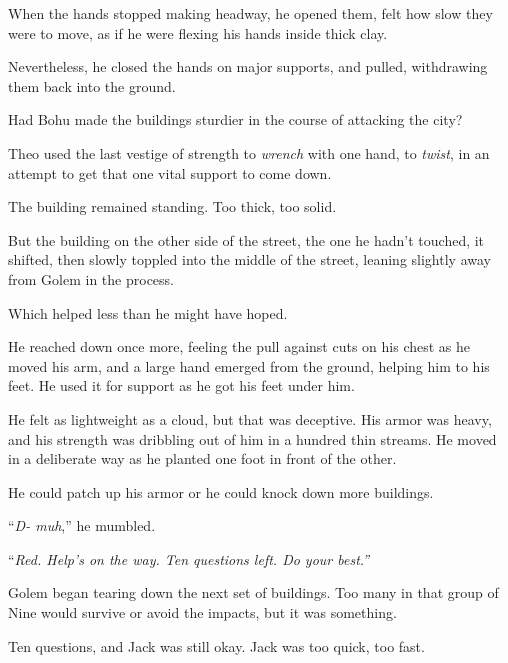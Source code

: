 When the hands stopped making headway, he opened them, felt how slow they were to move, as if he were flexing his hands inside thick clay.



Nevertheless, he closed the hands on major supports, and pulled, withdrawing them back into the ground.



Had Bohu made the buildings sturdier in the course of attacking the city?



Theo used the last vestige of strength to \emph{wrench} with one hand, to \emph{twist}, in an attempt to get that one vital support to come down.



The building remained standing.  Too thick, too solid.



But the building on the other side of the street, the one he hadn't touched, it shifted, then slowly toppled into the middle of the street, leaning slightly away from Golem in the process.



Which helped less than he might have hoped.



He reached down once more, feeling the pull against cuts on his chest as he moved his arm, and a large hand emerged from the ground, helping him to his feet.  He used it for support as he got his feet under him.



He felt as lightweight as a cloud, but that was deceptive.  His armor was heavy, and his strength was dribbling out of him in a hundred thin streams.  He moved in a deliberate way as he planted one foot in front of the other.



He could patch up his armor or he could knock down more buildings.



``\emph{D- muh},'' he mumbled.



``\emph{Red.  Help's on the way.  Ten questions left.  Do your best.''}



Golem began tearing down the next set of buildings.  Too many in that group of Nine would survive or avoid the impacts, but it was something.



Ten questions, and Jack was still okay.  Jack was too quick, too fast.



